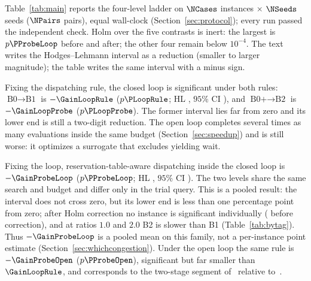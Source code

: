 Table~\ref{tab:main} reports the four-level ladder on $\NCases$ instances $\times$ $\NSeeds$ seeds ($\NPairs$ pairs), equal wall-clock (Section~\ref{sec:protocol}); every run passed the independent check.
Holm over the five contrasts is inert: the largest is $p\PProbeLoop$ before and after; the other four remain below $10^{-4}$.
The text writes the Hodges--Lehmann interval as a reduction (smaller to larger magnitude); the table writes the same interval with a minus sign.

\begin{table}[t]
\caption{Four-level ladder under an equal wall-clock budget, and the four one-factor pairs.
Negative is better.
$n=\NPairs$ pairs on $(\text{instance},\text{seed})$; two-sided Wilcoxon signed-rank; Holm over the five contrasts
($^{*}p<0.05$, $^{**}p<0.01$, $^{***}p<0.001$).
HL is the Hodges--Lehmann pseudomedian and its $95\%$ interval (same source as the test; the mean is for adding across tables, Section~\ref{sec:protocol}).
A bold header marks this paper's configuration, not a per-instance winner (Table~\ref{tab:bytag}).}
\label{tab:main}
\small

\end{table}

Fixing the dispatching rule, the closed loop is significant under both rules:
$\text{B0}\to\text{B1}$ is $-\GainLoopRule$ ($p\PLoopRule$; HL \HLLoopRule{}, $95\%$ CI \CILoopRule{}),
and $\text{B0+}\to\text{B2}$ is $-\GainLoopProbe$ ($p\PLoopProbe$).
The former interval lies far from zero and its lower end is still a two-digit reduction.
The open loop completes several times as many evaluations inside the same budget (Section~\ref{sec:speedup}) and is still worse: it optimizes a surrogate that excludes yielding wait.

Fixing the loop, reservation-table-aware dispatching inside the closed loop is $-\GainProbeLoop$ ($p\PProbeLoop$; HL \HLProbeLoop{}, $95\%$ CI \CIProbeLoop{}).
The two levels share the same search and budget and differ only in the trial query.
This is a pooled result: the interval does not cross zero, but its lower end is less than one percentage point from zero; after Holm correction no instance is significant individually (\CellsSigProbe{} before correction), and at ratios $1.0$ and $2.0$ B2 is slower than B1 (Table~\ref{tab:bytag}).
Thus $-\GainProbeLoop$ is a pooled mean on this family, not a per-instance point estimate (Section~\ref{sec:whichcongestion}).
Under the open loop the same rule is $-\GainProbeOpen$ ($p\PProbeOpen$), significant but far smaller than $\GainLoopRule$, and corresponds to the two-stage segment of~\cite{sun2023integrated} relative to~\cite{li2026framework}.


